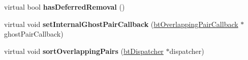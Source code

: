 \begin{DoxyCompactItemize}
\item 
\hypertarget{classbt_sorted_overlapping_pair_cache_a6b0a1c63e64e7975275b0c535261bc47}{virtual bool {\bfseries has\+Deferred\+Removal} ()}\label{classbt_sorted_overlapping_pair_cache_a6b0a1c63e64e7975275b0c535261bc47}

\item 
\hypertarget{classbt_sorted_overlapping_pair_cache_a15ec25362baaa8e2eaad2a0f3c04aaa5}{virtual void {\bfseries set\+Internal\+Ghost\+Pair\+Callback} (\hyperlink{classbt_overlapping_pair_callback}{bt\+Overlapping\+Pair\+Callback} $\ast$ghost\+Pair\+Callback)}\label{classbt_sorted_overlapping_pair_cache_a15ec25362baaa8e2eaad2a0f3c04aaa5}

\item 
\hypertarget{classbt_sorted_overlapping_pair_cache_ae58a25664f2ff3bd29836c2d13abcb24}{virtual void {\bfseries sort\+Overlapping\+Pairs} (\hyperlink{classbt_dispatcher}{bt\+Dispatcher} $\ast$dispatcher)}\label{classbt_sorted_overlapping_pair_cache_ae58a25664f2ff3bd29836c2d13abcb24}

\end{DoxyCompactItemize}
